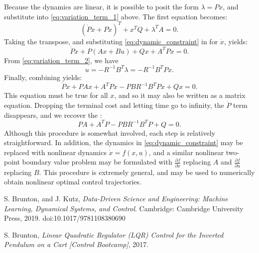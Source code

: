 \documentclass[a4 paper]{article}
\begin{document}
Because the dynamics are linear, it is possible to posit the form \( \lambda = P x \), and substitute into \ref{eq:variation_term_1} above. 
The first equation becomes:
\begin{equation}
    \left( \dot{P} x + P \dot{x} \right)^T + x^T Q + \lambda^T A = 0.
\label{eq:posit_form}
\end{equation}
Taking the transpose, and substituting \ref{eq:dynamic_constraint} in for \( \dot{x} \), yields:
\begin{equation}
    \dot{P} x + P (A x + B u) + Q x + A^T P x = 0.
\label{eq:transpose_substitution}
\end{equation}
From \ref{eq:variation_term_2}, we have
\begin{equation}
    u = -R^{-1} B^T \lambda = -R^{-1} B^T P x.
\label{eq:control_input}
\end{equation}
Finally, combining yields:
\begin{equation}
    \dot{P} x + P A x + A^T P x - P B R^{-1} B^T P x + Q x = 0.
\label{eq:combining_yields}
\end{equation}
This equation must be true for all \( x \), and so it may also be written as a matrix equation.
 Dropping the terminal cost and letting time go to infinity, the \( \dot{P} \) term disappears, and we recover the
:
\begin{equation}
    P A + A^T P - P B R^{-1} B^T P + Q = 0.
\label{eq:riccati_equation}
\end{equation}
Although this procedure is somewhat involved, each step is relatively straightforward. In addition, the dynamics in \ref{eq:dynamic_constraint} 
may be replaced with nonlinear dynamics \( \dot{x} = f(x,u) \), and a similar nonlinear two-point boundary value problem may be formulated 
with \( \frac{\partial f}{\partial x} \) replacing \( A \) and \( \frac{\partial f}{\partial u} \) replacing \( B \). 
This procedure is extremely general, and may be used to numerically obtain nonlinear optimal control trajectories.



\begin{thebibliography}{9}

    S. Brunton, and J. Kutz,
    \textit{Data-Driven Science and Engineering: Machine Learning, Dynamical Systems, and Control}.
    Cambridge: Cambridge University Press, 2019.
    doi:10.1017/9781108380690
    
    S. Brunton,
    \textit{Linear Quadratic Regulator (LQR) Control for the Inverted Pendulum on a Cart [Control Bootcamp]}, 2017.
    
\end{thebibliography}
\end{document}

